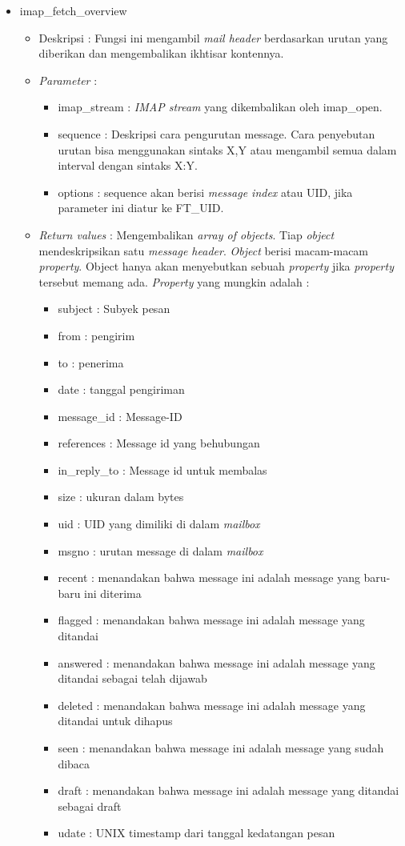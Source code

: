 \begin{itemize}
\item imap\_fetch\_overview
\begin{itemize}
\item Deskripsi : Fungsi ini mengambil \textit{mail header} berdasarkan urutan yang diberikan dan mengembalikan ikhtisar kontennya.
\item \textit{Parameter} :
\begin{itemize}
\item imap\_stream : \textit{IMAP stream} yang dikembalikan oleh imap\_open.
\item sequence : Deskripsi cara pengurutan message. Cara penyebutan urutan bisa menggunakan sintaks X,Y atau mengambil semua dalam interval dengan sintaks X:Y.
\item options : sequence akan berisi \textit{message index} atau UID, jika parameter ini diatur ke FT\_UID.
\end{itemize}
\item \textit{Return values} : Mengembalikan \textit{array of objects}. Tiap \textit{object} mendeskripsikan satu \textit{message header}. \textit{Object} berisi macam-macam \textit{property}. Object hanya akan menyebutkan sebuah \textit{property} jika \textit{property} tersebut memang ada. \textit{Property} yang mungkin adalah :
 \begin{itemize}
 \item subject : Subyek pesan
 \item from : pengirim
 \item to : penerima
 \item date : tanggal pengiriman
 \item message\_id : Message-ID
 \item references : Message id yang behubungan
 \item in\_reply\_to : Message id untuk membalas
 \item size : ukuran dalam bytes
 \item uid : UID yang dimiliki di dalam \textit{mailbox}
 \item msgno : urutan message di dalam \textit{mailbox}
 \item recent : menandakan bahwa message ini adalah message yang baru-baru ini diterima
 \item flagged : menandakan bahwa message ini adalah message yang ditandai
 \item answered : menandakan bahwa message ini adalah message yang ditandai sebagai telah dijawab
 \item deleted : menandakan bahwa message ini adalah message yang ditandai untuk dihapus
 \item seen : menandakan bahwa message ini adalah message yang sudah dibaca
 \item draft : menandakan bahwa message ini adalah message yang ditandai sebagai draft
 \item udate : UNIX timestamp dari tanggal kedatangan pesan
 \end{itemize} 
\end{itemize}
 

\end{itemize}
